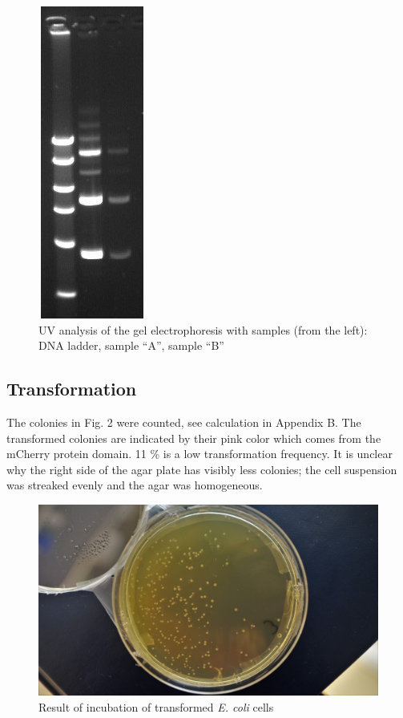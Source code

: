 \documentclass[11pt,a4paper]{article}
\begin{document}
\begin{figure}[H]
    \centering
    \includegraphics[scale=0.45]{Plasmid_Gel_Zoom_GeDoc 2020-03-31_13h00m41s.jpg}
    \caption{UV analysis of the gel electrophoresis with samples (from the left): DNA ladder, sample “A”, sample “B”}
    \label{fig1}
\end{figure}

 \subsection{Transformation}
The colonies in Fig. 2 were counted, see calculation in Appendix B. The transformed colonies are indicated by their pink color which comes from the mCherry protein domain. 11 \% is a low transformation frequency. It is unclear why the right side of the agar plate has visibly less colonies; the cell suspension was streaked evenly and the agar was homogeneous.

\begin{figure}[H]
    \centering
    \includegraphics[scale=0.04]{Dellabb 4 kolonier redigerad.jpg}
    \caption{Result of incubation of transformed \textit{E. coli} cells}
    \label{fig:my_label}
\end{figure}
\end{document}
